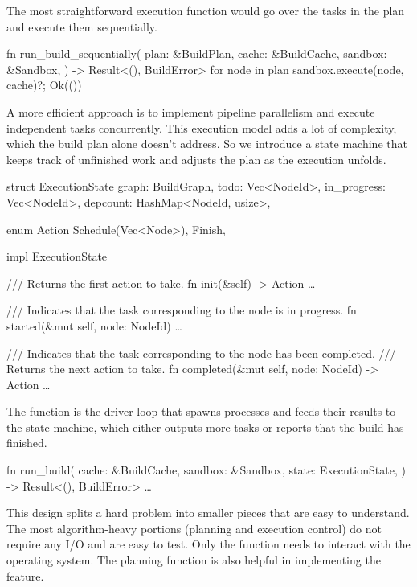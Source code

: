 \documentclass{article}
\begin{document}
The most straightforward execution function would go over the tasks in the plan and execute them sequentially.

\begin{code}[rust]
fn run_build_sequentially(
    plan: &BuildPlan,
    cache: &BuildCache,
    sandbox: &Sandbox,
) -> Result<(), BuildError> {
    for node in plan {
        sandbox.execute(node, cache)?;
    }
    Ok(())
}
\end{code}

A more efficient approach is to implement pipeline parallelism and execute independent tasks concurrently.
This execution model adds a lot of complexity, which the build plan alone doesn't address.
So we introduce a state machine that keeps track of unfinished work and adjusts the plan as the execution unfolds.

\begin{code}[rust]
struct ExecutionState {
    graph: BuildGraph,
    todo: Vec<NodeId>,
    in_progress: Vec<NodeId>,
    depcount: HashMap<NodeId, usize>,
}

enum Action {
    Schedule(Vec<Node>),
    Finish,
}

impl ExecutionState {
    /// Returns the first action to take.
    fn init(&self) -> Action { \ldots  }

    /// Indicates that the task corresponding to the node is in progress.
    fn started(&mut self, node: NodeId) { \ldots  }

    /// Indicates that the task corresponding to the node has been completed.
    /// Returns the next action to take.
    fn completed(&mut self, node: NodeId) -> Action { \ldots  }
}
\end{code}

The  function is the driver loop that spawns processes and feeds their results to the state machine, which either outputs more tasks or reports that the build has finished.

\begin{code}[rust]
fn run_build(
    cache: &BuildCache,
    sandbox: &Sandbox,
    state: ExecutionState,
) -> Result<(), BuildError> { \ldots  }
\end{code}

This design splits a hard problem into smaller pieces that are easy to understand.
The most algorithm-heavy portions (planning and execution control) do not require any I/O and are easy to test.
Only the  function needs to interact with the operating system.
The planning function is also helpful in implementing the  feature.
\end{document}
